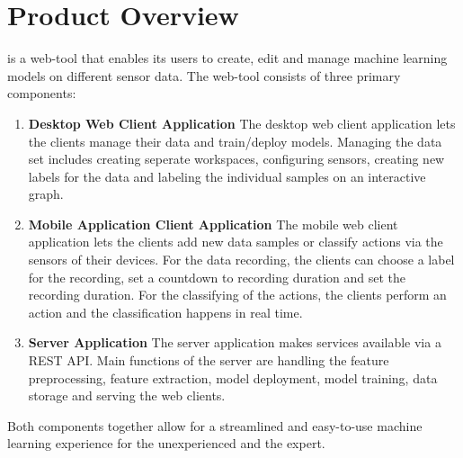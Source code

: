 \section{Product Overview}

 {\pseProjectName} is a web-tool that enables its users to create, edit and manage machine learning models on different sensor data. The web-tool consists of three primary components:

\begin{enumerate}
    \item \textbf{Desktop Web Client Application}
    The desktop web client application lets the clients manage their data and train/deploy models. Managing the data set includes creating seperate workspaces, configuring sensors, creating new labels for the data and labeling the individual samples on an interactive graph.

    \item \textbf{Mobile Application Client Application}
    The mobile web client application lets the clients add new data samples or classify actions via the sensors of their devices. For the data recording, the clients can choose a label for the recording, set a countdown to recording duration and set the recording duration. For the classifying of the actions, the clients perform an action and the classification happens in real time.

    \item \textbf{Server Application}
    The server application makes services available via a REST API. Main functions of the server are handling the feature preprocessing, feature extraction, model deployment, model training, data storage and serving the web clients.
\end{enumerate}

Both components together allow for a streamlined and easy-to-use machine learning experience for the unexperienced and the expert.